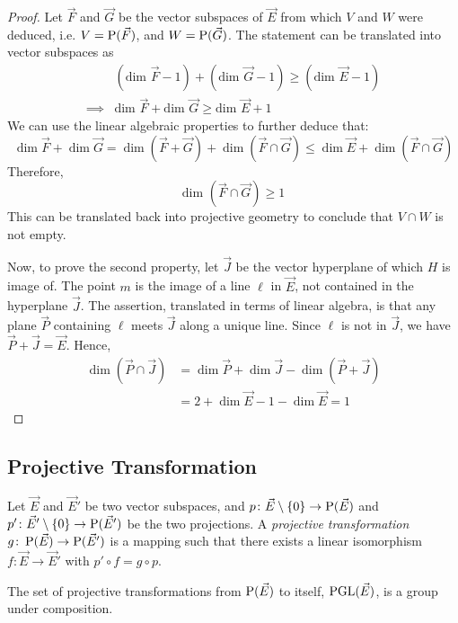 \begin{proof}
  Let $\vec{F}$ and $\vec{G}$ be the vector subspaces of $\vec{E}$ from which $V$ and $W$ were deduced, i.e.
  $V=\operatorname{P}(\vec{F})$, and $W=\operatorname{P}(\vec{G})$. The statement can be translated into vector subspaces as
  \begin{align*}
    & (\text{dim }\vec{F}-1)+(\text{dim }\vec{G}-1)\ge(\text{dim }\vec{E}-1)\\
    \implies& \text{dim }\vec{F}+\text{dim }\vec{G}\ge\text{dim }\vec{E}+1
  \end{align*}
  We can use the linear algebraic properties to further deduce that:
  \[
    \dim\vec{F}+\dim\vec{G}=\dim(\vec{F}+\vec{G})+\dim(\vec{F}\cap \vec{G})
    \le\dim\vec{E}+\dim(\vec{F}\cap \vec{G})
  \]
  Therefore,
  \[
    \text{dim }(\vec{F}\cap \vec{G})\ge1
  \]
  This can be translated back into projective geometry to conclude that $V\cap W$ is not empty.

  Now, to prove the second property, let $\vec{J}$ be the vector hyperplane of which $H$ is image of.
  The point $m$ is the image of a line $\ell$ in $\vec{E}$, not contained in the hyperplane $\vec{J}$.
  The assertion, translated in terms of linear algebra, is that any plane $\vec{P}$ containing $\ell$
  meets $\vec{J}$ along a unique line. Since $\ell$ is not in $\vec{J}$, we have $\vec{P}+\vec{J}=\vec{E}$. Hence,
  \begin{align*}
    \dim(\vec{P}\cap\vec{J}) &= \dim\vec{P}+\dim\vec{J}-\dim(\vec{P}+\vec{J})\\
                             &= 2+\dim\vec{E}-1-\dim\vec{E}=1
  \end{align*}
\end{proof}

\subsection{Projective Transformation}

\begin{definition}
  Let $\vec{E}$ and $\vec{E}'$ be two vector subspaces, and ${p\colon\vec{E}\setminus\{0\}\to\operatorname{P}(\vec{E})}$ and
  ${p'\colon\vec{E}'\setminus\{0\}\to\operatorname{P}(\vec{E}')}$ be the two projections. A \textit{projective transformation}
  ${g\colon\operatorname{P}(\vec{E})\to\operatorname{P}(\vec{E}')}$ is a mapping such that there exists a linear isomorphism
  ${f\colon\vec{E}\to\vec{E}'}$ with $p'\circ f=g\circ p$.
\end{definition}

\begin{prop}
  The set of projective transformations from $\operatorname{P}(\vec{E})$ to itself, $\operatorname{PGL}(\vec{E})$, is a group under
  composition.
\end{prop}

